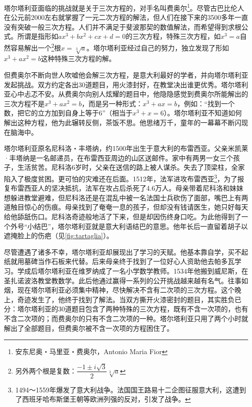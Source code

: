 \documentclass[b5paper]{ctexart}
\begin{document}
塔尔塔利亚面临的挑战就是关于三次方程的，对手名叫费奥尔\footnote{安东尼奥・马里亚・费奥尔，Antonio Maria Fior}。尽管古巴比伦人在公元前2000左右就掌握了一元二次方程的解法，但人们在接下来的3500多年一直没有突破一般三次方程。人们并不满足于斐波那契的数值解法，而希望得到求根公式。所谓是指形如$ax^3 + bx^2 + cx + d = 0$的三次方程，特殊三次方程，如$x^3 = a$自然容易解出一个\footnote{另外两个根是复数：$\dfrac{-1 \pm i\sqrt{3}}{2}\sqrt[3]{a}$}根$x = \sqrt[3]{a}$。塔尔塔利亚经过自己的努力，独立发现了形如$x^3 + ax^2 = b$这种特殊三次方程的解。

但费奥尔不断向世人吹嘘他会解三次方程，是意大利最好的学者，并向塔尔塔利亚发起挑战。双方约定各出30道题目，用火漆封好，在教堂决出谁更优秀。塔尔塔利亚心中忐忑不安。从费奥尔向别人炫耀的题目中，他隐隐感觉到费奥尔所能解出的三次方程不是$x^3 + ax^2 = b$，而是另一种形式：$x^3 + ax = b$，例如：“找到一个数，把它的立方加到自身上等于6”（相当于$x^3 + x = 6$）。塔尔塔利亚不知道如何解出这种方程\cite{MacTour-Tartaglia-Cardan}，他为此辗转反侧，茶饭不思。他思绪万千，童年的一幕幕不断闪现在脑海中。

塔尔塔利亚原名尼科洛・丰塔纳，约1500年出生于意大利的布雷西亚。父亲米凯莱·丰塔纳是一名邮递员，在布雷西亚周边的山区送邮件。家中有两男一女三个孩子，生活贫苦。尼科洛6岁时，父亲在送信的路上被人谋杀。失去了顶梁柱，全家陷入了极度贫困。更可怕的灾难还在后面。1512年，法军进攻布雷西亚\footnote{1494～1559年爆发了意大利战争。法国国王路易十二企图征服意大利，这遭到了西班牙哈布斯堡王朝等欧洲列强的反对，引发了战争。}，为了报复布雷西亚人的坚决抵抗，法军在攻占后杀死了4.6万人。母亲带着尼科洛和妹妹想躲进教堂避难，但尼科洛还是在混乱中被一名法国士兵砍伤了面部，嘴巴上有两道触目惊心的伤痕。母亲找到了奄奄一息的孩子，但却没有钱请医生，她只好每天给他舔舐伤口。尼科洛奇迹般地活了下来，但是却因伤终身口吃。为此他得到了一个外号“小结巴”，塔尔塔利亚就是意大利语结巴的意思。他年长后一直留着胡子以遮掩脸上的伤疤（见\cref{fig:tartaglia}）。

尽管遭遇了诸多不幸，塔尔塔利亚却展现出了学习的天赋。他基本靠自学，买不起纸就用墓碑当作石板来代替。后来母亲终于找到了一位好心人资助他去帕多瓦学习。学成后塔尔塔利亚在维罗纳成了一名小学数学教师。1534年他搬到威尼斯，在圣扎诺波洛教堂教数学。此后他通过赢得一系列的公开挑战越来越有名气\cite{MacTour-Tartaglia}。往事如烟，现在塔尔塔利亚必须集中精神，尽快解决不含有二次项的三次方程。这个晚上，奇迹发生了，他终于找到了解法。当双方撕开火漆密封的题目，其实胜负已分：塔尔塔利亚的30道题目包含了两种特殊的三次方程，既有不含一次项的，也有不含二次项的；而费奥尔的只有不含二次项的一种。塔尔塔利亚只用了两个小时就解出了全部题目，但费奥尔被不含一次项的方程困住了。
\end{document}

